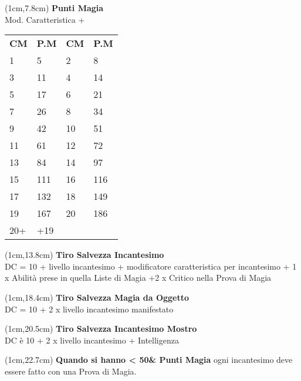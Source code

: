 \documentclass[a4paper,12 pt,openany]{book}
\begin{document}
{\footnotesize
\begin{textblock*}{5cm}(1cm,7.8cm) %
\textbf{Punti Magia}\\
Mod. Caratteristica + \\
\begin{tabular}{ll|ll}
\textbf{CM} & \textbf{P.M}&	\textbf{CM} & \textbf{P.M}\\
1 &5 &2&8 \\
3&11&4&14\\
5&17&6&21\\
7&26&8&34\\
9&42&10&51\\
11&61&12&72\\
13&84&14&97\\
15&111&16&116\\
17&132&18&149\\
19&167&20&186\\
20+&+19&&\\
	\hline
\end{tabular}
\end{textblock*} }

\begin{textblock*}{5cm}(1cm,13.8cm) %
\textbf{Tiro Salvezza Incantesimo}\\
DC = 10 + livello incantesimo + modificatore caratteristica per incantesimo + 1 x Abilità prese in quella Liste di Magia +2 x Critico nella Prova di Magia
\end{textblock*}

\begin{textblock*}{5cm}(1cm,18.4cm) %
\textbf{Tiro Salvezza Magia da Oggetto}\\
DC = 10 + 2 x livello incantesimo manifestato
\end{textblock*}

\begin{textblock*}{5cm}(1cm,20.5cm) %
	\textbf{Tiro Salvezza Incantesimo Mostro}\\
DC è 10 + 2 x livello incantesimo + Intelligenza
\end{textblock*}

\begin{textblock*}{5cm}(1cm,22.7cm) %
{\small
\textbf{Quando si hanno < 50\& Punti Magia} ogni incantesimo deve essere fatto con una Prova di Magia.}
\end{textblock*}
\end{document}
